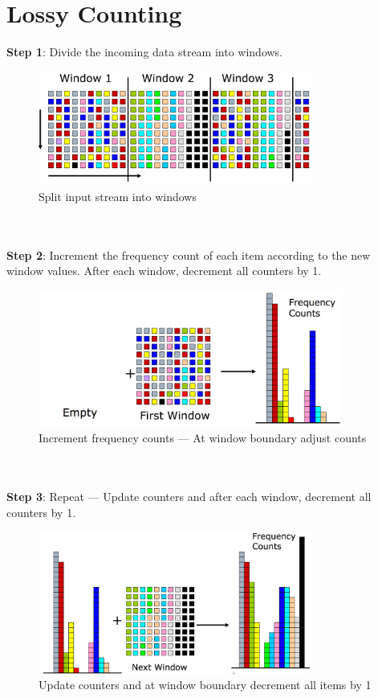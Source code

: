 \documentclass[a3paper, 12pt]{book} %
\begin{document}
\section{Lossy Counting}
\textbf{Step 1}: Divide the incoming data stream into windows. 
\begin{figure}[htpb]
	\centering
	\includegraphics[width=9cm]{figures/step_1_lossy_counting.png}
	\caption{Split input stream into windows}
	\label{fig:boat1}
\end{figure}
\\\\
\textbf{Step 2}: Increment the frequency count of each item according to the new window values. After each window, decrement all counters by 1.
\begin{figure}[htpb]
	\centering
	\includegraphics[width=10cm]{figures/step_2_lossy_counting.png}
	\caption{Increment frequency counts --- At window boundary adjust counts}
	\label{fig:boat1}
\end{figure}
\\\\
\textbf{Step 3}: Repeat --- Update counters and after each window, decrement all counters by 1.
\begin{figure}[htpb]
	\centering
	\includegraphics[width=9cm]{figures/step_3_lossy_counting.png}
	\caption{Update counters and at window boundary decrement all items by 1}
	\label{fig:boat1}
\end{figure}
\end{document}
